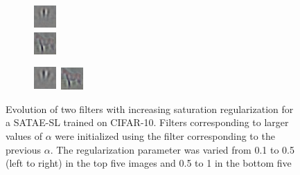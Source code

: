 \documentclass{article} %
\begin{document}
\begin{figure}
\begin{subfigure}[b]{0.15\textwidth}
	\end{subfigure} 
	\begin{subfigure}[b]{0.15\textwidth}
		\centering 
		\includegraphics[scale=2]{./4.png} \\
		\includegraphics[scale=2]{./horse4.png} 
	\end{subfigure} 
	\begin{subfigure}[b]{0.15\textwidth}
		\centering 
		\includegraphics[scale=2]{./5.png}
		\includegraphics[scale=2]{./horse5.png} \\
		
	\end{subfigure} 
\caption{Evolution of two filters with increasing saturation regularization for a SATAE-SL trained on CIFAR-10. Filters corresponding to larger values of $\alpha$ were initialized using the filter corresponding to the previous $\alpha$. The regularization parameter was varied from 0.1 to 0.5 (left to right) in the top five images and 0.5 to 1 in the bottom five }
\label{fig:horse}
\end{figure} 
\end{document}
